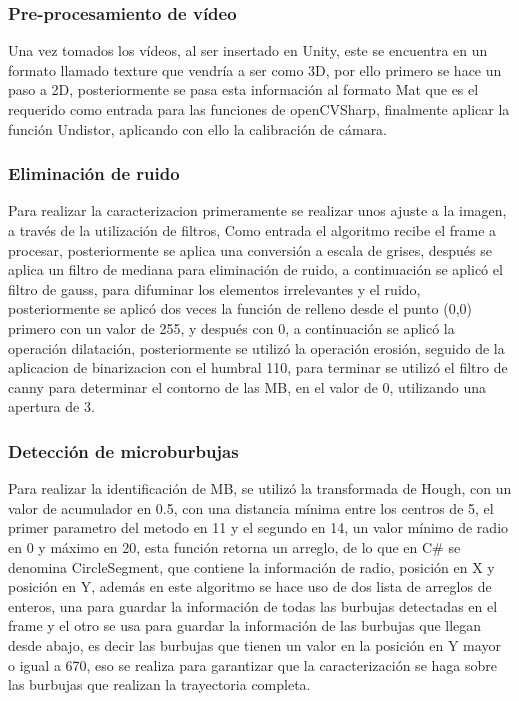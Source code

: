 \documentclass[12pt,twocolumn,a4paper]{article}
\begin{document}
\subsubsection{Pre-procesamiento de vídeo}

Una vez tomados los vídeos, al ser insertado en Unity, este se encuentra en un formato llamado texture que vendría a ser como 3D, por ello primero se hace un paso a 2D, posteriormente se pasa esta información al formato Mat que es el requerido como entrada para las funciones de openCVSharp, finalmente aplicar la función Undistor, aplicando con ello la calibración de cámara.  

\subsubsection{Eliminación de ruido}

Para realizar la caracterizacion primeramente se realizar unos ajuste a la imagen, a través de la utilización de filtros, Como entrada el algoritmo recibe el frame a procesar, posteriormente se aplica una conversión  a escala de grises, después se aplica un filtro de mediana para eliminación de ruido, a continuación se aplicó el filtro de  gauss, para difuminar los elementos irrelevantes y el ruido, posteriormente se aplicó dos veces la función de relleno desde el punto (0,0) primero con un valor de 255, y después con 0, a continuación se aplicó la operación dilatación, posteriormente se utilizó la operación erosión, seguido de la aplicacion de binarizacion con el humbral  110,  para terminar se  utilizó el filtro de canny para determinar el contorno de las MB, en el valor de 0, utilizando una apertura de 3.


\subsubsection{Detección de microburbujas}

Para realizar la identificación de MB, se utilizó la transformada de Hough, con un valor de acumulador en 0.5, con una distancia mínima entre los centros de 5, el primer parametro del metodo en 11 y el segundo en 14, un valor mínimo de radio en 0 y máximo en 20, esta función retorna un arreglo, de lo que en C\# se denomina CircleSegment, que contiene la información de radio, posición en X y posición en Y, además en este algoritmo se hace uso de dos lista de arreglos de enteros, una para guardar la información de todas las burbujas detectadas en el frame y el otro se usa para guardar la información de las burbujas que llegan desde abajo, es decir las burbujas que tienen un valor en la posición en Y mayor o igual a 670, eso se realiza para garantizar que la  caracterización se haga sobre las burbujas que realizan la trayectoria completa. 
\end{document}
